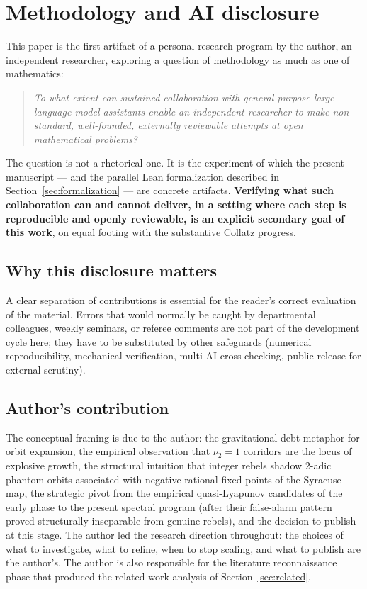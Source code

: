 \documentclass[11pt,a4paper]{article}
\theoremstyle{definition}
\begin{document}
\section{Methodology and AI disclosure}
\label{sec:methodology}

This paper is the first artifact of a personal research program by
the author, an independent researcher, exploring a question of
methodology as much as one of mathematics:
\begin{quote}
\emph{To what extent can sustained collaboration with general-purpose
large language model assistants enable an independent researcher to
make non-standard, well-founded, externally reviewable attempts at
open mathematical problems?}
\end{quote}
The question is not a rhetorical one. It is the experiment of which
the present manuscript --- and the parallel Lean formalization
described in Section~\ref{sec:formalization} --- are concrete
artifacts. \textbf{Verifying what such collaboration can and cannot
deliver, in a setting where each step is reproducible and openly
reviewable, is an explicit secondary goal of this work}, on equal
footing with the substantive Collatz progress.

\subsection{Why this disclosure matters}

A clear separation of contributions is essential for the reader's
correct evaluation of the material. Errors that would normally be
caught by departmental colleagues, weekly seminars, or referee
comments are not part of the development cycle here; they have to
be substituted by other safeguards (numerical reproducibility,
mechanical verification, multi-AI cross-checking, public release
for external scrutiny).

\subsection{Author's contribution}

The conceptual framing is due to the author: the gravitational
debt metaphor for orbit expansion, the empirical observation that
$\nu_2 = 1$ corridors are the locus of explosive growth, the
structural intuition that integer rebels shadow $2$-adic phantom
orbits associated with negative rational fixed points of the
Syracuse map, the strategic pivot from the empirical
quasi-Lyapunov candidates of the early phase to the present
spectral program (after their false-alarm pattern proved
structurally inseparable from genuine rebels), and the decision to
publish at this stage. The author led the research direction
throughout: the choices of what to investigate, what to refine,
when to stop scaling, and what to publish are the author's. The
author is also responsible for the literature reconnaissance
phase that produced the related-work analysis of
Section~\ref{sec:related}.
\end{document}
